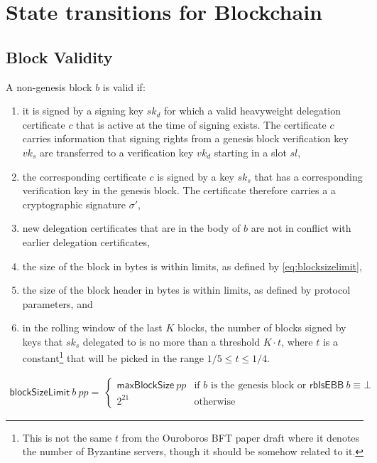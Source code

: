\documentclass[11pt,a4paper]{article}
\newcommand{\var}[1]{\mathit{#1}}
\newcommand{\fun}[1]{\mathsf{#1}}
\newcommand{\blocksizelimitname}{blockSizeLimit}
\newcommand{\maxblocksizename}{maxBlockSize}
\newcommand{\isebbname}{rbIsEBB}
\newcommand{\blocksizelimit}[2]{\fun{\blocksizelimitname} ~ #1 ~ #2}
\newcommand{\maxblocksize}[1]{\fun{\maxblocksizename} ~ #1}
\newcommand{\isebb}[1]{\fun{\isebbname} ~ #1}
\begin{document}
\section{State transitions for Blockchain}
\label{sec:state-trans-chain}

\subsection{Block Validity}
\label{sec:block-valid}

A non-genesis block $\var{b}$ is valid if:
%
\begin{enumerate}
\item it is signed by a signing key $sk_d$ for which a valid heavyweight
  delegation certificate $c$ that is active at the time of signing exists.
  The certificate $c$ carries information that signing rights from a genesis
  block verification key $vk_s$ are transferred to a verification key $vk_d$
  starting in a slot $sl$,
\item the corresponding certificate $c$ is signed by a key $sk_s$ that has a
  corresponding verification key in the genesis block.
  The certificate therefore carries a a cryptographic signature $\sigma'$,
\item new delegation certificates that are in the body of $b$ are not in
  conflict with earlier delegation certificates,
\item the size of the block in bytes is within limits, as defined by
  \eqref{eq:blocksizelimit},
\item the size of the block header in bytes is within limits, as defined by
  protocol parameters, and
\item in the rolling window of the last $K$ blocks, the number of blocks
  signed by keys that $sk_s$ delegated to is no more than a threshold
  $K \cdot t$, where $t$ is a constant\footnote{This is not the same $t$ from
    the Ouroboros BFT paper draft where it denotes the number of Byzantine
    servers, though it should be somehow related to it.}  that will be picked
  in the range $1/5 \leq t \leq 1/4$.
\end{enumerate}

\begin{align}
  \label{eq:blocksizelimit}
  \blocksizelimit{b}{\var{pp}} = \
  \begin{cases}
    \maxblocksize{\var{pp}} & \text{if $b$ is the genesis block or } \isebb{b} \equiv \bot \\
    2^{21} & \text{otherwise}
  \end{cases}
\end{align}
\end{document}
